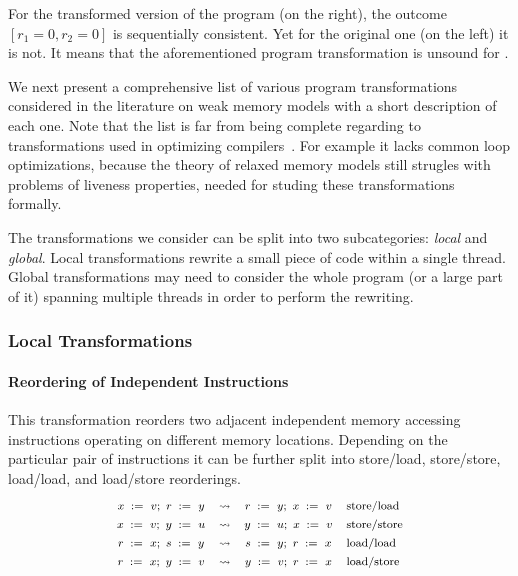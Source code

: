 For the transformed version of the program (on the right),
the outcome $[r_1=0, r_2=0]$ is sequentially consistent.
Yet for the original one (on the left) it is not. 
It means that the aforementioned program transformation
is unsound for \SC. 

We next present a comprehensive list of 
various program transformations considered in
the literature on weak memory models 
with a short description of each one.
Note that the list is far from being complete regarding to  
transformations used in optimizing compilers~\cite{Muchnick:ACDI97}.
For example it lacks common loop optimizations, 
because the theory of relaxed memory models still
strugles with problems of liveness properties, 
needed for studing these transformations formally. 

The transformations we consider can be split into 
two subcategories: \emph{local} and \emph{global}.
Local transformations rewrite a small 
piece of code within a single thread.
Global transformations may need to consider 
the whole program (or a large part of it) 
spanning multiple threads in order 
to perform the rewriting.       
 
\subsubsection{Local Transformations}

\paragraph{Reordering of Independent Instructions} 

This transformation reorders two 
adjacent independent memory accessing instructions
operating on different memory locations.
Depending on the particular pair of instructions
it can be further split into store/load, store/store, 
load/load, and load/store reorderings.  
%
\[\def\arraystretch{1.4}\footnotesize
  \begin{array}{cccl} 

      \writeInst{}{x}{v} \seq \readInst{}{r}{y} 
    & \leadsto 
    & \readInst{}{r}{y} \seq \writeInst{}{x}{v}
    & \text{store/load}  \\ 

      \writeInst{}{x}{v} \seq \writeInst{}{y}{u} 
    & \leadsto 
    & \writeInst{}{y}{u} \seq \writeInst{}{x}{v}
    & \text{store/store}  \\ 

      \readInst{}{r}{x} \seq \readInst{}{s}{y} 
    & \leadsto 
    & \readInst{}{s}{y} \seq \readInst{}{r}{x}
    & \text{load/load}  \\ 

      \readInst{}{r}{x} \seq \writeInst{}{y}{v} 
    & \leadsto 
    & \writeInst{}{y}{v} \seq \readInst{}{r}{x}
    & \text{load/store}  \\ 

  \end{array}
\]

